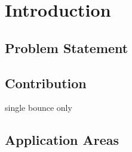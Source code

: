 
\chapter{Introduction}


\section{Problem Statement}



\section{Contribution}

single bounce only



\section{Application Areas}


\cleardoublepage
